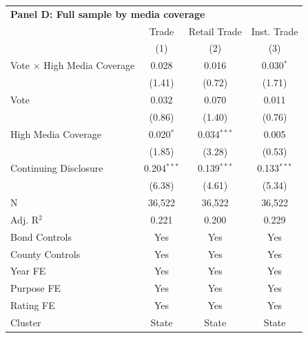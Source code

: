 \begingroup
\centering
\begin{tabular*}{\textwidth}{@{\extracolsep{\fill}}lccc}
\multicolumn{5}{l}{\textbf{Panel D: Full sample by media coverage}}\\

\addlinespace
   \toprule
                                      & Trade         & Retail Trade  & Inst. Trade\\  
                                      & (1)           & (2)           & (3)\\  
   \midrule 
   Vote $\times$ High Media Coverage  & 0.028         & 0.016         & 0.030$^{*}$\\   
                                      & (1.41)       & (0.72)       & (1.71)\\   
   Vote                               & 0.032         & 0.070         & 0.011\\   
                                      & (0.86)       & (1.40)       & (0.76)\\   
   High Media Coverage                & 0.020$^{*}$   & 0.034$^{***}$ & 0.005\\   
                                      & (1.85)       & (3.28)       & (0.53)\\   
   Continuing Disclosure              & 0.204$^{***}$ & 0.139$^{***}$ & 0.133$^{***}$\\   
                                      & (6.38)       & (4.61)       & (5.34)\\   
   \hline
   N                       & 36,522        & 36,522        & 36,522\\  
   Adj. R$^2$                     & 0.221         & 0.200         & 0.229\\  
   Bond Controls                      & Yes           & Yes           & Yes\\  
   County Controls                    & Yes           & Yes           & Yes\\  
   Year FE                            & Yes           & Yes           & Yes\\  
   Purpose FE                         & Yes           & Yes           & Yes\\  
   Rating FE                          & Yes           & Yes           & Yes\\  
   Cluster              & State & State & State\\  
   \bottomrule
\end{tabular*}
\par\endgroup
